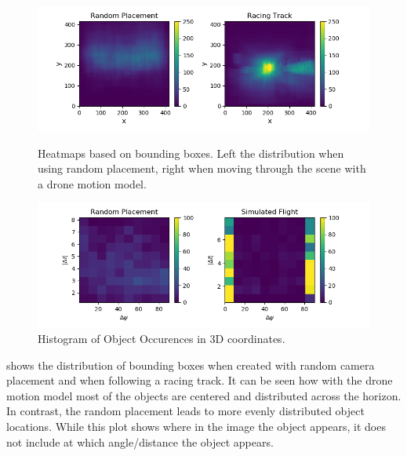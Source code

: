 	\begin{figure}
		\begin{minipage}{\textwidth}
			\includegraphics[width=\textwidth]{fig/heatmap_camplace}
			\caption{Heatmaps based on bounding boxes. Left the distribution when using random placement, right when moving through the scene with a drone motion model.}
			\label{fig:heatmap_camplace}
		\end{minipage}
		\begin{minipage}{\textwidth}
			\includegraphics[width=\textwidth]{fig/hist2d_camplace}
			\caption{Histogram of Object Occurences in 3D coordinates.}
			\label{fig:hist2d_camplace}
		\end{minipage}
	\end{figure}
	
	 shows the distribution of bounding boxes when created with random camera placement and when following a racing track. It can be seen how with the drone motion model most of the objects are centered and distributed across the horizon. In contrast, the random placement leads to more evenly distributed object locations. While this plot shows where in the image the object appears, it does not include at which angle/distance the object appears.
	
